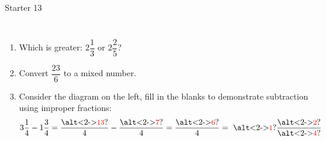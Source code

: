 \documentclass{beamer}
\newcommand{\ashow}[1]{\uncover<2->{\textcolor{red}{\small #1}}}
\newcommand{\ashowq}[1]{\alt<2->{\textcolor{red}{\small #1}}{?}}
\begin{document}
\begin{frame}{Starter 13}
\begin{columns}
\begin{enumerate}
  \item Which is greater: $2\dfrac{1}{3}$ or $2\dfrac{2}{5}$? \ashow{$2\frac{2}{5}$}
  \item Convert $\dfrac{23}{6}$ to a mixed number. \ashow{$=3\frac{5}{6}$}
  \item Consider the diagram on the left, fill in the blanks to demonstrate subtraction using improper fractions:
  \[
    3\frac{1}{4} - 1\frac{3}{4} = \frac{\text{{\ashowq{13}}}}{4} - \frac{\text{{\ashowq{7}}}}{4} = \frac{\text{{\ashowq{6}}}}{4} = \ \text{{\ashowq{1}}} \frac{\text{{\ashowq{2}}}}{\text{{\ashowq{4}}}}
  \]
  
\end{enumerate}

\end{columns}
\end{frame}
\end{document}
